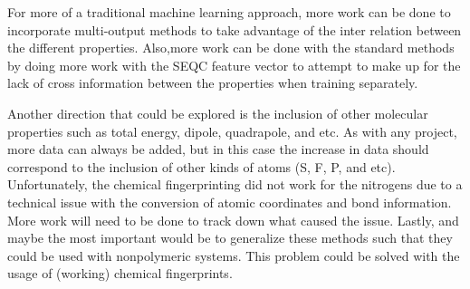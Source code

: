 \documentclass[10pt, oneside]{article}   	%
\begin{document}
For more of a traditional machine learning approach, more work can be done to incorporate multi-output methods to take advantage of the inter relation between the different properties. Also,more work can be done with the standard methods by doing more work with the SEQC feature vector to attempt to make up for the lack of cross information between the properties when training separately.

Another direction that could be explored is the inclusion of other molecular properties such as total energy, dipole, quadrapole, and etc. As with any project, more data can always be added, but in this case the increase in data should correspond to the inclusion of other kinds of atoms (S, F, P, and etc). Unfortunately, the chemical fingerprinting did not work for the nitrogens due to a technical issue with the conversion of atomic coordinates and bond information. More work will need to be done to track down what caused the issue. Lastly, and maybe the most important would be to generalize these methods such that they could be used with nonpolymeric systems. This problem could be solved with the usage of (working) chemical fingerprints.


\nocite{gaussian}
\nocite{hc}
\nocite{scikit-learn}
\nocite{Hansen}
\nocite{scipy}
\nocite{rdkit}
\nocite{matplotlib}
\nocite{numpy}

\end{document}
